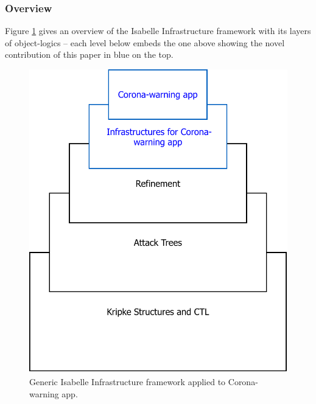 \documentclass{llncs}
\begin{document}
\subsubsection{Overview}
\label{sec:isainfover}
Figure \ref{fig:theorystruc} gives an overview of the Isabelle Infrastructure 
framework with its layers of object-logics -- each level below embeds the one
above showing the novel contribution of this paper in blue on the top. 
\begin{figure}
\begin{center}
  \includegraphics[scale=.5]{theory_structure.pdf}
\end{center}
\caption{Generic Isabelle Infrastructure framework applied to Corona-warning app.}
\label{fig:theorystruc}
\end{figure}
\end{document}
